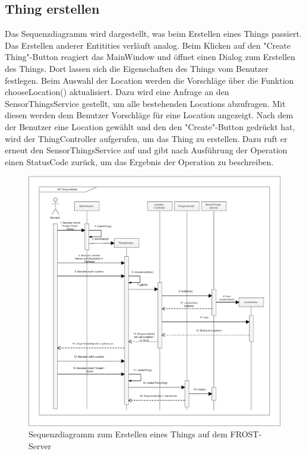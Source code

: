 \clearpage
\subsection{Thing erstellen}

Das Sequenzdiagramm wird dargestellt, was beim Erstellen eines Things passiert.
Das Erstellen anderer Entitities verläuft analog.
Beim Klicken auf den "{Create Thing}"{-Button} reagiert das MainWindow und öffnet einen Dialog zum Erstellen des Things.
Dort lassen sich die Eigenschaften des Things vom Benutzer festlegen.
Beim Auswahl der Location werden die Vorschläge über die Funktion chooseLocation() aktualisiert.
Dazu wird eine Anfrage an den SensorThingsService gestellt, um alle bestehenden Locations abzufragen.
Mit diesen werden dem Benutzer Vorschläge für eine Location angezeigt.
Nach dem der Benutzer eine Location gewählt und den den "{Create}"{-Button} gedrückt hat, wird der ThingController aufgerufen, um das Thing zu erstellen.
Dazu ruft er erneut den SensorThingsService auf und gibt nach Ausführung der Operation einen StatusCode zurück, um das Ergebnis der Operation zu beschreiben.

\begin{figure}[htbp]
\centering
\includegraphics[scale=0.4]{uml/SD_createThing.eps}
\caption{Sequenzdiagramm zum Erstellen eines Things auf dem FROST-Server}
\end{figure}